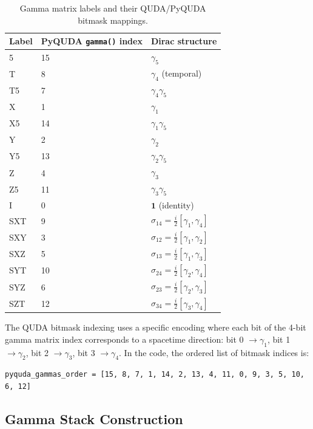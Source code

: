 \documentclass[11pt]{article}
\begin{document}
\begin{table}[H]
\centering
\caption{Gamma matrix labels and their QUDA/PyQUDA bitmask mappings.}
\begin{tabular}{lll}
\toprule
\textbf{Label} & \textbf{PyQUDA \texttt{gamma()} index} & \textbf{Dirac structure} \\
\midrule
5    & 15 & $\gamma_5$ \\
T    & 8  & $\gamma_4$ (temporal) \\
T5   & 7  & $\gamma_4 \gamma_5$ \\
X    & 1  & $\gamma_1$ \\
X5   & 14 & $\gamma_1 \gamma_5$ \\
Y    & 2  & $\gamma_2$ \\
Y5   & 13 & $\gamma_2 \gamma_5$ \\
Z    & 4  & $\gamma_3$ \\
Z5   & 11 & $\gamma_3 \gamma_5$ \\
I    & 0  & $\mathbf{1}$ (identity) \\
SXT  & 9  & $\sigma_{14} = \frac{i}{2}[\gamma_1, \gamma_4]$ \\
SXY  & 3  & $\sigma_{12} = \frac{i}{2}[\gamma_1, \gamma_2]$ \\
SXZ  & 5  & $\sigma_{13} = \frac{i}{2}[\gamma_1, \gamma_3]$ \\
SYT  & 10 & $\sigma_{24} = \frac{i}{2}[\gamma_2, \gamma_4]$ \\
SYZ  & 6  & $\sigma_{23} = \frac{i}{2}[\gamma_2, \gamma_3]$ \\
SZT  & 12 & $\sigma_{34} = \frac{i}{2}[\gamma_3, \gamma_4]$ \\
\bottomrule
\end{tabular}
\label{tab:gamma}
\end{table}

The QUDA bitmask indexing uses a specific encoding where each bit of the 4-bit gamma matrix index corresponds to a spacetime direction: bit 0 $\to \gamma_1$, bit 1 $\to \gamma_2$, bit 2 $\to \gamma_3$, bit 3 $\to \gamma_4$. In the code, the ordered list of bitmask indices is:

\begin{verbatim}
pyquda_gammas_order = [15, 8, 7, 1, 14, 2, 13, 4, 11, 0, 9, 3, 5, 10, 6, 12]
\end{verbatim}

\subsection{Gamma Stack Construction}
\end{document}
